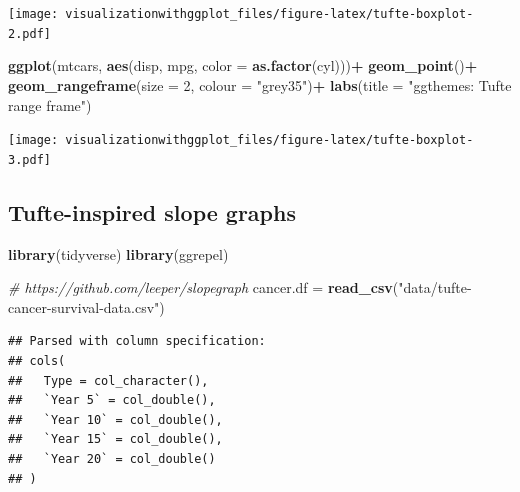 \documentclass[]{krantz}
\makeatletter
\newenvironment{Shaded}{\begin{snugshade}}{\end{snugshade}}
\newcommand{\CommentTok}[1]{\textcolor[rgb]{0.56,0.35,0.01}{\textit{#1}}}
\newcommand{\DataTypeTok}[1]{\textcolor[rgb]{0.13,0.29,0.53}{#1}}
\newcommand{\DecValTok}[1]{\textcolor[rgb]{0.00,0.00,0.81}{#1}}
\newcommand{\KeywordTok}[1]{\textcolor[rgb]{0.13,0.29,0.53}{\textbf{#1}}}
\newcommand{\NormalTok}[1]{#1}
\newcommand{\OperatorTok}[1]{\textcolor[rgb]{0.81,0.36,0.00}{\textbf{#1}}}
\newcommand{\StringTok}[1]{\textcolor[rgb]{0.31,0.60,0.02}{#1}}
\newenvironment{kframe}{%
\medskip{}
\setlength{\fboxsep}{.8em}
 \def\at@end@of@kframe{}%
 \ifinner\ifhmode%
  \def\at@end@of@kframe{\end{minipage}}%
  \begin{minipage}{\columnwidth}%
 \fi\fi%
 \def\FrameCommand##1{\hskip\@totalleftmargin \hskip-\fboxsep
 \colorbox{shadecolor}{##1}\hskip-\fboxsep
     \hskip-\linewidth \hskip-\@totalleftmargin \hskip\columnwidth}%
 \MakeFramed {\advance\hsize-\width
   \@totalleftmargin\z@ \linewidth\hsize
   \@setminipage}}%
 {\par\unskip\endMakeFramed%
 \at@end@of@kframe}
\renewenvironment{Shaded}{\begin{kframe}}{\end{kframe}}
\makeatother
\begin{document}
\texttt{[image: visualizationwithggplot\_files/figure-latex/tufte-boxplot-2.pdf]}

\begin{Shaded}
\begin{Highlighting}[]
\KeywordTok{ggplot}\NormalTok{(mtcars, }\KeywordTok{aes}\NormalTok{(disp, mpg, }\DataTypeTok{color =} \KeywordTok{as.factor}\NormalTok{(cyl)))}\OperatorTok{+}
\KeywordTok{geom_point}\NormalTok{()}\OperatorTok{+}
\StringTok{  }\KeywordTok{geom_rangeframe}\NormalTok{(}\DataTypeTok{size =} \DecValTok{2}\NormalTok{, }\DataTypeTok{colour =} \StringTok{"grey35"}\NormalTok{)}\OperatorTok{+}
\StringTok{  }\KeywordTok{labs}\NormalTok{(}\DataTypeTok{title =} \StringTok{"ggthemes: Tufte range frame"}\NormalTok{)}
\end{Highlighting}
\end{Shaded}

\texttt{[image: visualizationwithggplot\_files/figure-latex/tufte-boxplot-3.pdf]}

\hypertarget{tufte-slopegraph}{%
\subsection{Tufte-inspired slope graphs}\label{tufte-slopegraph}}

\begin{Shaded}
\begin{Highlighting}[]
\KeywordTok{library}\NormalTok{(tidyverse)}
\KeywordTok{library}\NormalTok{(ggrepel)}

\CommentTok{# https://github.com/leeper/slopegraph}
\NormalTok{cancer.df =}\StringTok{ }\KeywordTok{read_csv}\NormalTok{(}\StringTok{"data/tufte-cancer-survival-data.csv"}\NormalTok{)}
\end{Highlighting}
\end{Shaded}

\begin{verbatim}
## Parsed with column specification:
## cols(
##   Type = col_character(),
##   `Year 5` = col_double(),
##   `Year 10` = col_double(),
##   `Year 15` = col_double(),
##   `Year 20` = col_double()
## )
\end{verbatim}
\end{document}
